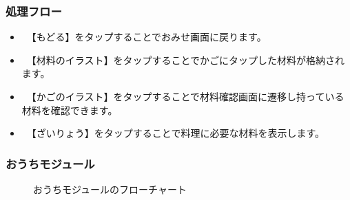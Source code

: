 \documentclass[a4j]{jarticle}
\begin{document}
\subsubsection*{処理フロー}
\begin{itemize}
\item　【もどる】をタップすることでおみせ画面に戻ります。
\item　【材料のイラスト】をタップすることでかごにタップした材料が格納されます。
\item　【かごのイラスト】をタップすることで材料確認画面に遷移し持っている材料を確認できます。
\item　【ざいりょう】をタップすることで料理に必要な材料を表示します。
\end{itemize}

\newpage
\subsubsection{おうちモジュール\label{おうち}}
\begin{figure}[H]
    \begin{center}
    \caption {おうちモジュールのフローチャート}
    \label{outi}
    \end{center}
\end{figure}
\end{document}
